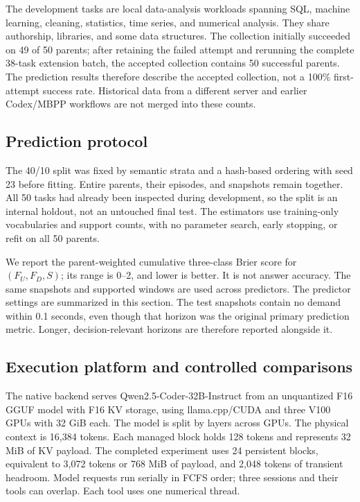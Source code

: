 \documentclass[sigconf, screen, review]{acmart}
\begin{document}
The development tasks are local data-analysis workloads spanning SQL,
machine learning, cleaning, statistics, time series, and numerical
analysis. They share authorship, libraries, and some data structures.
The collection initially succeeded on 49 of 50 parents; after retaining
the failed attempt and rerunning the complete 38-task extension batch,
the accepted collection contains 50 successful parents. The prediction
results therefore describe the accepted collection, not a 100\%
first-attempt success rate. Historical data from a different server and
earlier Codex/MBPP workflows are not merged into these counts.

\subsection{Prediction protocol}\label{prediction-protocol}

The 40/10 split was fixed by semantic strata and a hash-based ordering
with seed 23 before fitting. Entire parents, their episodes, and
snapshots remain together. All 50 tasks had already been inspected
during development, so the split is an internal holdout, not an
untouched final test. The estimators use training-only vocabularies and
support counts, with no parameter search, early stopping, or refit on
all 50 parents.

We report the parent-weighted cumulative three-class Brier score for
\((F_U,F_D,S)\); its range is 0--2, and lower is better. It is not
answer accuracy. The same snapshots and supported windows are used
across predictors. The predictor settings are summarized in this section.
The test snapshots contain no demand within 0.1 seconds, even though
that horizon was the original primary prediction metric. Longer,
decision-relevant horizons are therefore reported alongside it.

\subsection{Execution platform and controlled
comparisons}\label{execution-platform-and-controlled-comparisons}

The native backend serves Qwen2.5-Coder-32B-Instruct from an unquantized
F16 GGUF model with F16 KV storage, using llama.cpp/CUDA and three V100
GPUs with 32 GiB each. The model is split by layers across GPUs. The
physical context is 16,384 tokens. Each managed block holds 128 tokens
and represents 32 MiB of KV payload. The completed experiment uses 24
persistent blocks, equivalent to 3,072 tokens or 768 MiB of payload, and
2,048 tokens of transient headroom. Model requests run serially in FCFS
order; three sessions and their tools can overlap. Each tool uses one
numerical thread.
\end{document}
